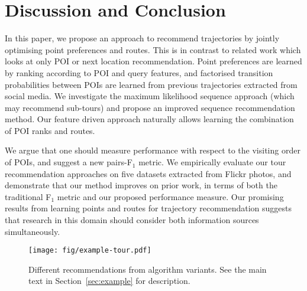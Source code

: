\section{Discussion and Conclusion}
\label{sec:conclusion}

In this paper, we propose an approach to recommend trajectories
by jointly optimising point preferences and routes.
This is in contrast to related work which looks at only POI or next location recommendation.
Point preferences are learned by ranking according to POI and query features,
and factorised transition probabilities between POIs
are learned from previous trajectories extracted from social media.
We investigate the maximum likelihood sequence approach (which
may recommend sub-tours) and propose an improved sequence recommendation method.
Our feature driven approach naturally allows learning the combination of POI ranks and routes.

We argue that one should measure performance with respect to the visiting order of POIs,
and suggest a new pairs-F$_1$ metric.
We empirically evaluate our tour recommendation approaches on five datasets extracted from
Flickr photos, and demonstrate that our method improves on prior work,
in terms of both the traditional F$_1$ metric and our proposed performance measure.
Our promising results from learning points and routes for trajectory recommendation suggests
that research in this domain should consider both information sources simultaneously.


\begin{figure*}[t]
	\centering
	\texttt{[image: fig/example-tour.pdf]}
	\caption{Different recommendations from algorithm variants.
    See the main text in Section~\ref{sec:example} for description.}
	\label{fig:exampleresult}
\end{figure*}
